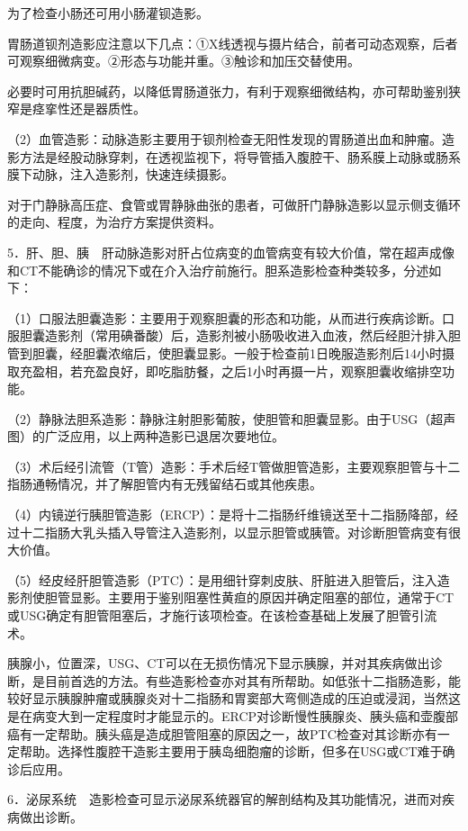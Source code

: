 为了检查小肠还可用小肠灌钡造影。

胃肠道钡剂造影应注意以下几点：①X线透视与摄片结合，前者可动态观察，后者可观察细微病变。②形态与功能并重。③触诊和加压交替使用。

必要时可用抗胆碱药，以降低胃肠道张力，有利于观察细微结构，亦可帮助鉴别狭窄是痉挛性还是器质性。

（2）血管造影：动脉造影主要用于钡剂检查无阳性发现的胃肠道出血和肿瘤。造影方法是经股动脉穿刺，在透视监视下，将导管插入腹腔干、肠系膜上动脉或肠系膜下动脉，注入造影剂，快速连续摄影。

对于门静脉高压症、食管或胃静脉曲张的患者，可做肝门静脉造影以显示侧支循环的走向、程度，为治疗方案提供资料。

5．肝、胆、胰　肝动脉造影对肝占位病变的血管病变有较大价值，常在超声成像和CT不能确诊的情况下或在介入治疗前施行。胆系造影检查种类较多，分述如下：

（1）口服法胆囊造影：主要用于观察胆囊的形态和功能，从而进行疾病诊断。口服胆囊造影剂（常用碘番酸）后，造影剂被小肠吸收进入血液，然后经胆汁排入胆管到胆囊，经胆囊浓缩后，使胆囊显影。一般于检查前1日晚服造影剂后14小时摄取充盈相，若充盈良好，即吃脂肪餐，之后1小时再摄一片，观察胆囊收缩排空功能。

（2）静脉法胆系造影：静脉注射胆影葡胺，使胆管和胆囊显影。由于USG（超声图）的广泛应用，以上两种造影已退居次要地位。

（3）术后经引流管（T管）造影：手术后经T管做胆管造影，主要观察胆管与十二指肠通畅情况，并了解胆管内有无残留结石或其他疾患。

（4）内镜逆行胰胆管造影（ERCP）：是将十二指肠纤维镜送至十二指肠降部，经过十二指肠大乳头插入导管注入造影剂，以显示胆管或胰管。对诊断胆管病变有很大价值。

（5）经皮经肝胆管造影（PTC）：是用细针穿刺皮肤、肝脏进入胆管后，注入造影剂使胆管显影。主要用于鉴别阻塞性黄疸的原因并确定阻塞的部位，通常于CT或USG确定有胆管阻塞后，才施行该项检查。在该检查基础上发展了胆管引流术。

胰腺小，位置深，USG、CT可以在无损伤情况下显示胰腺，并对其疾病做出诊断，是目前首选的方法。有些造影检查亦对其有所帮助。如低张十二指肠造影，能较好显示胰腺肿瘤或胰腺炎对十二指肠和胃窦部大弯侧造成的压迫或浸润，当然这是在病变大到一定程度时才能显示的。ERCP对诊断慢性胰腺炎、胰头癌和壶腹部癌有一定帮助。胰头癌是造成胆管阻塞的原因之一，故PTC检查对其诊断亦有一定帮助。选择性腹腔干造影主要用于胰岛细胞瘤的诊断，但多在USG或CT难于确诊后应用。

6．泌尿系统　造影检查可显示泌尿系统器官的解剖结构及其功能情况，进而对疾病做出诊断。

